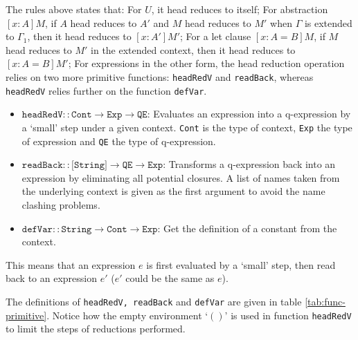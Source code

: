 The rules above states that: For $U$, it head reduces to itself; For abstraction $[x : A] M$, if $A$ head reduces to $A'$ and $M$ head reduces to $M'$ when $\Gamma$ is extended to $\Gamma_1$, then it head reduces to $[x : A'] M'$; For a let clause $[x : A = B] M$, if $M$ head reduces to $M'$ in the extended context, then it head reduces to $[x : A = B] M'$; For expressions in the other form, the head reduction operation relies on two more primitive functions: \texttt{headRedV} and \texttt{readBack}, whereas \texttt{headRedV} relies further on the function \texttt{defVar}. 
\begin{itemize}
\item $\texttt{headRedV} :: \texttt{Cont} \to \texttt{Exp} \to \texttt{QE}$: Evaluates an expression into a q-expression by a `small' step under a given context. \texttt{Cont} is the type of context, \texttt{Exp} the type of expression and \texttt{QE} the type of q-expression. 
\item $\texttt{readBack} :: \texttt{[String]} \to \texttt{QE} \to \texttt{Exp}$: Transforms a q-expression back into an expression by eliminating all potential closures. A list of names taken from the underlying context is given as the first argument to avoid the name clashing problems. 
\item $\texttt{defVar} :: \texttt{String} \to \texttt{Cont} \to \texttt{Exp}$: Get the definition of a constant from the context.
\end{itemize}
This means that an expression $e$ is first evaluated by a `small' step, then read back to an expression $e'$ ($e'$ could be the same as $e$).

The definitions of \texttt{headRedV, readBack} and \texttt{defVar} are given in table \ref{tab:func-primitive}. Notice how the empty environment `$()$' is used in function \texttt{headRedV} to limit the steps of reductions performed.

